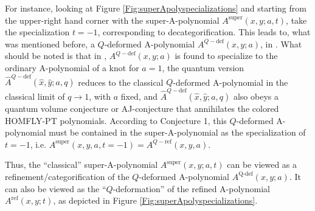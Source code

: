 \documentclass[a4paper,titlepage,twoside]{book}
\begin{document}
For instance, looking at Figure \ref{Fig:superApolyspecializations} and starting from the upper-right hand corner with the super-A-polynomial $A^{\text{super}}{(x,y;a,t)}$, take the specialization $t=-1$, corresponding to decategorification.  This leads to, what was mentioned before, a $Q$-deformed A-polynomial $A^{Q-\text{def}}{(x,y;a)}$, in \cite{AganagicVafa2012}.  What should be noted is that in \cite{AganagicVafa2012}, $A^{Q-\text{def}}{(x,y;a)}$ is found to specialize to the ordinary A-polynomial of a knot for $a=1$, the quantum version $\widehat{A}^{Q-\text{def}}{(\widehat{x},\widehat{y};a,q)}$ reduces to the classical $Q$-deformed A-polynomial in the classical limit of $q\to 1$, with $a$ fixed, and $\widehat{A}^{Q-\text{def}}{(\widehat{x}, \widehat{y};a,q)}$ also obeys a quantum volume conjecture or AJ-conjecture that annihilates the colored HOMFLY-PT polynomials.  According to Conjecture 1, this $Q$-deformed A-polynomial must be contained in the super-A-polynomial as the specialization of $t=-1$, i.e. $A^{\text{super}}{ (x,y,a,t=-1)} = A^{Q-\text{ref}}{(x,y,a)}$. 




Thus, the ``classical'' super-A-polynomial $A^{\text{super}}{(x,y;a,t)}$ can be viewed as a refinement/categorification of the $Q$-deformed A-polynomial $A^{\text{Q-def}}{ (x,y;a)}$.  It can also be viewed as the ``$Q$-deformation'' of the refined A-polynomial $A^{\text{ref}}{ (x,y;t)}$, as depicted in Figure \ref{Fig:superApolyspecializations}. %
\end{document}
